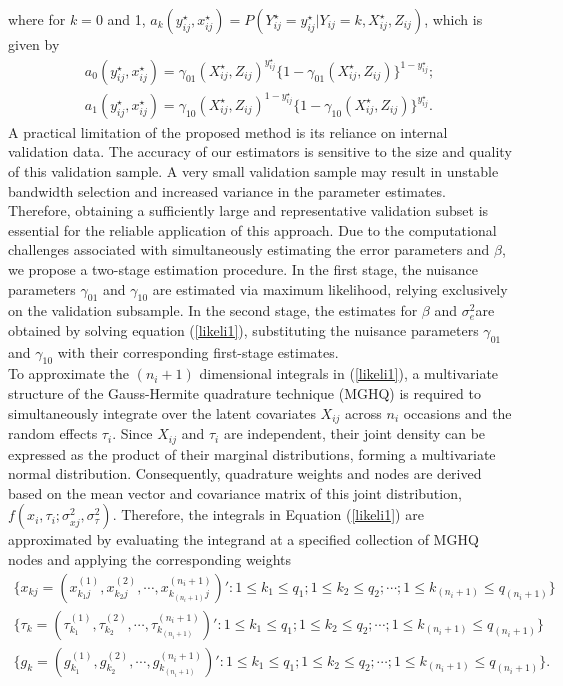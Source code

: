 \documentclass[twoside]{article}
\begin{document}
 where for $k=0$ and 1, $a_k(y_{ij}^{\star},x_{ij}^{\star})=P(Y_{ij}^{\star}=y_{ij}^{\star}|Y_{ij}=k,X_{ij}^{\star},Z_{ij})$, which is given by
 \begin{eqnarray*}
a_0(y_{ij}^{\star},x_{ij}^{\star})=\gamma_{01}(X_{ij}^{\star},Z_{ij})^{y_{ij}^{\star}}\{1-\gamma_{01}(X_{ij}^{\star},Z_{ij})\}^{1-y_{ij}^{\star}};\\
 a_1(y_{ij}^{\star},x_{ij}^{\star})=\gamma_{10}(X_{ij}^{\star},Z_{ij})^{1-y_{ij}^{\star}}\{1-\gamma_{10}(X_{ij}^{\star},Z_{ij})\}^{y_{ij}^{\star}}.
 \end{eqnarray*}
 A practical limitation of the proposed method is its reliance on internal validation data. The accuracy of our estimators is sensitive to the size and quality of this validation sample. A very small validation sample may result in unstable bandwidth selection and increased variance in the parameter estimates. Therefore, obtaining a sufficiently large and representative validation subset is essential for the reliable application of this approach.
 Due to the computational challenges associated with simultaneously estimating the error parameters and $\beta$, we propose a two-stage estimation procedure. In the first stage, the nuisance parameters $\gamma_{01}$ and $\gamma_{10}$ are estimated via maximum likelihood, relying exclusively on the validation subsample. In the second stage, the estimates for $\beta$ and $\sigma _e^2$​ are obtained by solving equation (\ref{likeli1}), substituting the nuisance parameters $\gamma_{01}$ and $\gamma_{10}$ with their corresponding first-stage estimates.\\
 To approximate the $(n_i+1)$ dimensional integrals in (\ref{likeli1}), a multivariate structure of the Gauss-Hermite quadrature technique (MGHQ) is required to simultaneously integrate over the latent covariates $X_{ij}$ across $n_i$ occasions and the random effects $\tau _i$. Since $X_{ij}$ and $\tau _i$ are independent, their joint density can be expressed as the product of their marginal distributions, forming a multivariate normal distribution. Consequently, quadrature weights and nodes are derived based on the mean vector and covariance matrix of this joint distribution, $f(x_{i}, \tau _i;\sigma _{xj}^2,\sigma _{\tau}^2)$.  Therefore, the integrals in Equation (\ref{likeli1}) are approximated by evaluating the integrand at a specified collection of MGHQ nodes and applying the corresponding weights
\begin{eqnarray*}
\{x_{kj}=(x_{{k_1}j}^{(1)},x_{{k_2}j}^{(2)},\cdots,x_{k_{(n_i+1)}j}^{(n_i +1)})': 1\leq k_1 \leq q_1;1 \leq k_2 \leq q_2;\cdots ;1 \leq k_{(n_i+1)} \leq q_{(n_i+1)}\}\\
\{\tau_k=(\tau_{k_1}^{(1)},\tau_{k_2}^{(2)},\cdots,\tau_{k_{(n_i+1)}}^{(n_i+1)})':1\leq k_1 \leq q_1;1 \leq k_2 \leq q_2;\cdots ;1 \leq k_{(n_i+1)} \leq q_{(n_i+1)}\}\\
\{g_k=(g_{k_1}^{(1)},g_{k_2}^{(2)},\cdots ,g_{k_{(n_i+1)}}^{(n_i+1)})':1\leq k_1 \leq q_1;1 \leq k_2 \leq q_2;\cdots ;1 \leq k_{(n_i+1)} \leq q_{(n_i+1)}\}.
\end{eqnarray*}
\end{document}
